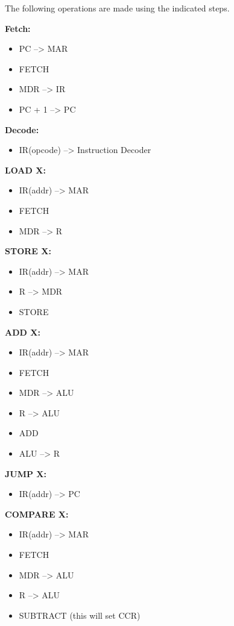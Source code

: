 \documentclass[]{article}
\begin{document}
The following operations are made using the indicated steps.\\\bigbreak

\textbf{Fetch:}
\begin{itemize}
	\item PC --> MAR
	\item FETCH
	\item MDR --> IR
	\item PC + 1 --> PC
\end{itemize}\bigbreak\bigbreak

\textbf{Decode:}
\begin{itemize}
	\item IR(opcode) --> Instruction Decoder
\end{itemize}\bigbreak\bigbreak

\textbf{LOAD X:}
\begin{itemize}
	\item IR(addr) --> MAR
	\item FETCH
	\item MDR --> R
\end{itemize}\bigbreak\bigbreak

\textbf{STORE X:}
\begin{itemize}
	\item IR(addr) --> MAR
	\item R --> MDR
	\item STORE
\end{itemize}\bigbreak\bigbreak

\textbf{ADD X:}
\begin{itemize}
	\item IR(addr) --> MAR
	\item FETCH
	\item MDR --> ALU
	\item R --> ALU
	\item ADD
	\item ALU --> R
\end{itemize}\bigbreak\bigbreak

\textbf{JUMP X:}
\begin{itemize}
	\item IR(addr) --> PC
\end{itemize}\bigbreak\bigbreak

\textbf{COMPARE X:}
\begin{itemize}
	\item IR(addr) --> MAR
	\item FETCH
	\item MDR --> ALU
	\item R --> ALU
	\item SUBTRACT (this will set CCR)
\end{itemize}\bigbreak\bigbreak
\end{document}
